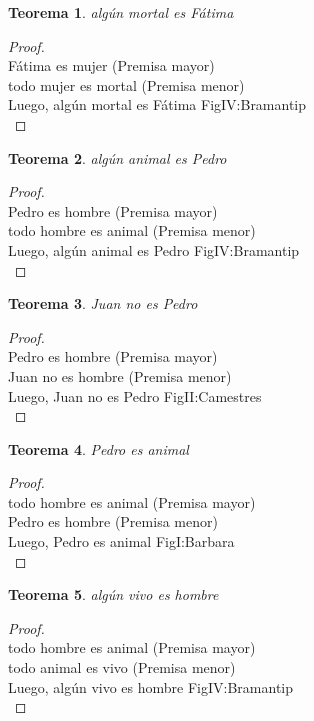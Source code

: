 ﻿\documentclass[12pt]{book}
\newtheorem{theorem}{Teorema}[chapter]
\newtheorem{proof}{Demostración}
\begin{document}
\begin{theorem}
algún mortal es Fátima
\label{th: 14}
\end{theorem}\begin{proof}\\Fátima es mujer	 (Premisa mayor) \\todo mujer es mortal	 (Premisa menor) \\Luego, algún mortal es Fátima	FigIV:Bramantip \\ \end{proof}
\begin{theorem}
algún animal es Pedro
\label{th: 15}
\end{theorem}\begin{proof}\\Pedro es hombre	 (Premisa mayor) \\todo hombre es animal	 (Premisa menor) \\Luego, algún animal es Pedro	FigIV:Bramantip \\ \end{proof}
\begin{theorem}
Juan no es Pedro
\label{th: 16}
\end{theorem}\begin{proof}\\Pedro es hombre	 (Premisa mayor) \\Juan no es hombre	 (Premisa menor) \\Luego, Juan no es Pedro	FigII:Camestres \\ \end{proof}
\begin{theorem}
Pedro es animal
\label{th: 17}
\end{theorem}\begin{proof}\\todo hombre es animal	 (Premisa mayor) \\Pedro es hombre	 (Premisa menor) \\Luego, Pedro es animal	FigI:Barbara \\ \end{proof}
\begin{theorem}
algún vivo es hombre
\label{th: 18}
\end{theorem}\begin{proof}\\todo hombre es animal	 (Premisa mayor) \\todo animal es vivo	 (Premisa menor) \\Luego, algún vivo es hombre	FigIV:Bramantip \\ \end{proof}
\end{document}
